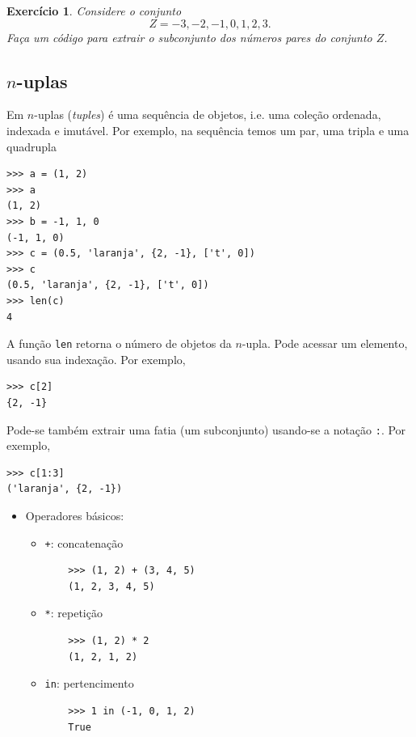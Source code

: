 \documentclass[12pt]{article}
\newtheorem{exr}{Exercício}[section]
\begin{document}
\begin{exr}
  Considere o conjunto
  \begin{equation}
    Z = {-3, -2, -1, 0, 1, 2, 3}.
  \end{equation}
  Faça um código {\python} para extrair o subconjunto dos números pares do conjunto $Z$.
\end{exr}

\subsection{$n$-uplas}

Em {\python} $n$-uplas ({\it tuples}) é uma sequência de objetos, i.e. uma coleção ordenada, indexada e imutável. Por exemplo, na sequência temos um par, uma tripla e uma quadrupla
\begin{lstlisting}
>>> a = (1, 2)
>>> a
(1, 2)
>>> b = -1, 1, 0
(-1, 1, 0)
>>> c = (0.5, 'laranja', {2, -1}, ['t', 0])
>>> c
(0.5, 'laranja', {2, -1}, ['t', 0])
>>> len(c)
4
\end{lstlisting}
A função \lstinline+len+ retorna o número de objetos da $n$-upla. Pode acessar um elemento, usando sua indexação. Por exemplo,
\begin{lstlisting}
>>> c[2]
{2, -1}
\end{lstlisting}
Pode-se também extrair uma fatia (um subconjunto) usando-se a notação \lstinline+:+. Por exemplo,
\begin{lstlisting}
>>> c[1:3]
('laranja', {2, -1})
\end{lstlisting}

\begin{itemize}
\item Operadores básicos:
  \begin{itemize}
  \item[] \lstinline-+-: concatenação
    \begin{lstlisting}
    >>> (1, 2) + (3, 4, 5)
    (1, 2, 3, 4, 5)
    \end{lstlisting}
  \item[] \lstinline+*+: repetição
    \begin{lstlisting}
    >>> (1, 2) * 2
    (1, 2, 1, 2)
    \end{lstlisting}
  \item[] \lstinline+in+: pertencimento
    \begin{lstlisting}
    >>> 1 in (-1, 0, 1, 2)
    True
    \end{lstlisting}
  \end{itemize}
\end{itemize}
\end{document}
